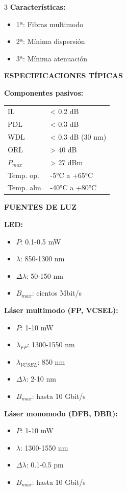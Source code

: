 \documentclass[10pt,a4paper,landscape]{article}
\newcommand{\secbox}[1]{\colorbox{blue!20}{\textbf{#1}}}
\begin{document}
\begin{multicols}{3}
\vspace{0.2cm}
\textbf{Características:}
\begin{itemize}
\item 1ª: Fibras multimodo
\item 2ª: Mínima dispersión
\item 3ª: Mínima atenuación
\end{itemize}

\secbox{ESPECIFICACIONES TÍPICAS}

\textbf{Componentes pasivos:}
\begin{tabular}{ll}
IL & < 0.2 dB \\
PDL & < 0.3 dB \\
WDL & < 0.3 dB (30 nm) \\
ORL & > 40 dB \\
$P_{max}$ & > 27 dBm \\
Temp. op. & -5°C a +65°C \\
Temp. alm. & -40°C a +80°C \\
\end{tabular}

\secbox{FUENTES DE LUZ}

\textbf{LED:}
\begin{itemize}
\item $P$: 0.1-0.5 mW
\item $\lambda$: 850-1300 nm
\item $\Delta\lambda$: 50-150 nm
\item $B_{max}$: cientos Mbit/s
\end{itemize}

\textbf{Láser multimodo (FP, VCSEL):}
\begin{itemize}
\item $P$: 1-10 mW
\item $\lambda_{FP}$: 1300-1550 nm
\item $\lambda_{VCSEL}$: 850 nm
\item $\Delta\lambda$: 2-10 nm
\item $B_{max}$: hasta 10 Gbit/s
\end{itemize}

\textbf{Láser monomodo (DFB, DBR):}
\begin{itemize}
\item $P$: 1-10 mW
\item $\lambda$: 1300-1550 nm
\item $\Delta\lambda$: 0.1-0.5 pm
\item $B_{max}$: hasta 10 Gbit/s
\end{itemize}


\end{multicols}
\end{document}
